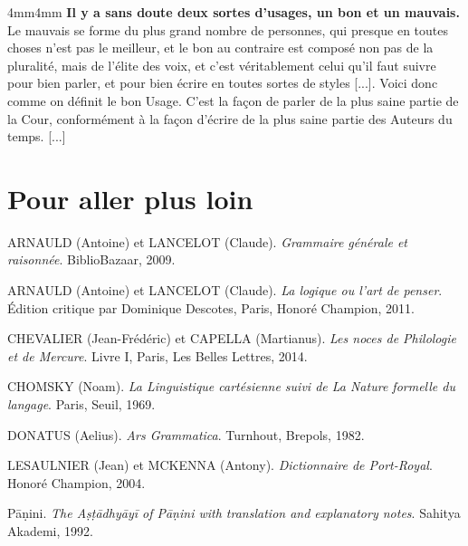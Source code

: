 \begin{adjustwidth}{4mm}{4mm}\small\setlength{\parindent}{0pt}
\textbf{Il y a sans doute deux sortes d’usages, un bon et un mauvais.} Le mauvais se forme du plus grand nombre de personnes, qui presque en toutes choses n’est pas le meilleur, et le bon au contraire est composé non pas de la pluralité, mais de l’élite des voix, et c’est véritablement celui qu’il faut suivre pour bien parler, et pour bien écrire en toutes sortes de styles [...]. Voici donc comme on définit le bon Usage. C’est la façon de parler de la plus saine partie de la Cour, conformément à la façon d’écrire de la plus saine partie des Auteurs du temps. [...]
\end{adjustwidth}
\section*{Pour aller plus loin}
{}
\begingroup\small\setlength{\parindent}{0pt}\setlength{\parskip}{.55em}
ARNAULD (Antoine) et LANCELOT (Claude). \textit{Grammaire générale et raisonnée}. BiblioBazaar, 2009.

ARNAULD (Antoine) et LANCELOT (Claude). \textit{La logique ou l’art de penser}. Édition critique par Dominique Descotes, Paris, Honoré Champion, 2011.

CHEVALIER (Jean-Frédéric) et CAPELLA (Martianus). \textit{Les noces de Philologie et de Mercure}. Livre I, Paris, Les Belles Lettres, 2014.

CHOMSKY (Noam). \textit{La Linguistique cartésienne suivi de La Nature formelle du langage}. Paris, Seuil, 1969.

DONATUS (Aelius). \textit{Ars Grammatica}. Turnhout, Brepols, 1982.

LESAULNIER (Jean) et MCKENNA (Antony). \textit{Dictionnaire de Port-Royal}. Honoré Champion, 2004.

Pāṇini. \textit{The Aṣṭādhyāyī of Pāṇini with translation and explanatory notes}. Sahitya Akademi, 1992.

